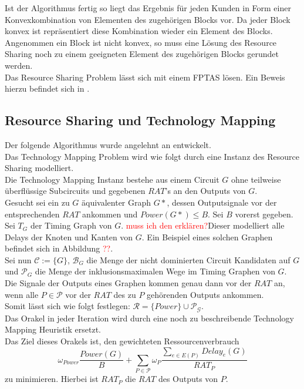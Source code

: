 \documentclass[11pt, a4paper, german]{article}
\newcommand{\TM}{Technology  Mapping }
\begin{document}
Ist der Algorithmus fertig so liegt das Ergebnis für jeden Kunden in Form einer Konvexkombination von Elementen des zugehörigen Blocks vor. Da jeder Block konvex ist repräsentiert diese Kombination wieder ein Element des Blocks. \\
Angenommen ein Block ist nicht konvex, so muss eine Lösung des Resource Sharing noch zu einem geeigneten Element des zugehörigen Blocks gerundet werden.\\

Das Resource Sharing Problem lässt sich mit einem FPTAS lösen. Ein Beweis hierzu befindet sich in \cite{Vygen2011}.

\subsection{Resource Sharing und \TM}
Der folgende Algorithmus wurde angelehnt an \cite{Daboul2018} entwickelt.\\
Das \TM Problem wird wie folgt durch eine Instanz des Resource Sharing modelliert.\\
Die \TM Instanz bestehe aus einem Circuit $G$ ohne teilweise überflüssige Subcircuits und gegebenen $RAT$'s an den Outputs von $G$. \\
Gesucht sei ein zu $G$ äquivalenter Graph $G*$, dessen Outputsignale vor der entsprechenden $RAT$ ankommen und $Power(G*) \leq B$. Sei $B$ vorerst gegeben. \\
Sei $T_G$ der Timing Graph von $G$. \textcolor{red}{muss ich den erklären?}Dieser modelliert alle Delays der Knoten und Kanten von $G$. Ein Beispiel eines solchen Graphen befindet sich in Abbildung \textcolor{red}{??}.\\
Sei nun $\mathcal{C} := \{G\} $, $\mathcal{B}_G$ die Menge der nicht dominierten Circuit Kandidaten auf $G$ und $\mathcal{P}_G$ die Menge der inklusionsmaximalen Wege im Timing Graphen von $G$. Die Signale der Outputs eines Graphen kommen genau dann vor der $RAT$ an, wenn  alle $P \in \mathcal{P}$  vor der $RAT$ des zu $P$ gehörenden Outputs ankommen.\\
Somit lässt sich wie folgt festlegen: $\mathcal{R} = \{Power\} \cup \mathcal{P_G}$. \\
Das Orakel in jeder Iteration wird durch eine noch zu beschreibende \TM Heuristik ersetzt. \\
Das Ziel dieses Orakels ist, den gewichteten Ressourcenverbrauch
\begin{equation}\label{eq:ressourcen_verbrauch_1}
\omega _{Power} \frac{Power(G)}{B} + \sum\limits_{P \in \mathcal{P}} \omega _P \frac{\sum_{e \in E(P)}Delay_e(G)}{RAT_P}
\end{equation}
 zu minimieren. Hierbei ist $RAT_P$ die $RAT$ des Outputs von $P$.
\end{document}
